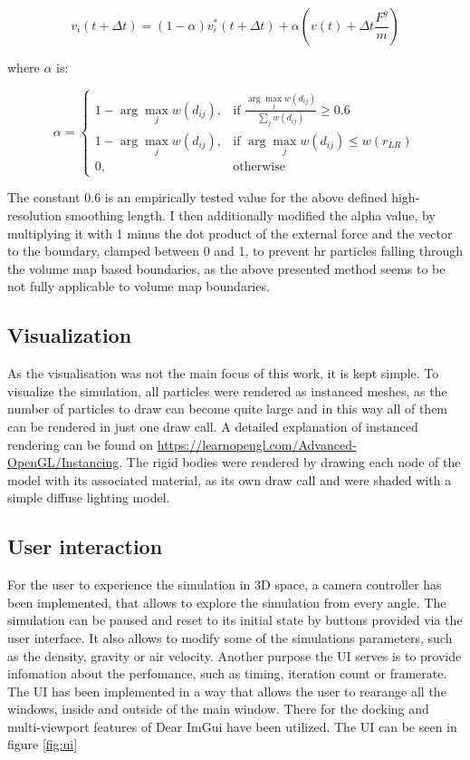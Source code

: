 \documentclass[intern]{cgMA}
\begin{document}
    \begin{equation}
        v_i(t + \Delta t)  = (1 - \alpha)v_i^*(t + \Delta t) + \alpha(v(t) + \Delta t \frac{F^g}{m})
    \end{equation}

    where $\alpha$ is:

    \begin{equation}
        \alpha = 
        \begin{cases}
            1 - \arg \max_j w(d_{ij}),& \text{if } \frac{\arg \max_j w(d_{ij})}{\sum_j w(d_{ij})} \geq 0.6 \\
            1 - \arg \max_j w(d_{ij}),& \text{if } \arg \max_j w(d_{ij}) \leq w(r_{LR}) \\
            0,              & \text{otherwise}
        \end{cases}
    \end{equation}

    The constant $0.6$ is an empirically tested value for the above defined high-resolution smoothing length. \cite{10.2312:PE:vriphys:vriphys12:053-060} I then additionally modified the alpha value, by multiplying it with 1 minus the dot product of the external force and the vector to the boundary, clamped between 0 and 1, to prevent hr particles falling through the volume map based boundaries, as the above presented method seems to be not fully applicable to volume map boundaries.
    
    \subsection{Visualization}
    As the visualisation was not the main focus of this work, it is kept simple. To visualize the simulation, all particles were rendered as instanced meshes, as the number of particles to draw can become quite large and in this way all of them can be rendered in just one draw call. A detailed explanation of instanced rendering can be found on \url{https://learnopengl.com/Advanced-OpenGL/Instancing}. The rigid bodies were rendered by drawing each node of the model with its associated material, as its own draw call and were shaded with a simple diffuse lighting model.

    \subsection{User interaction}
    For the user to experience the simulation in 3D space, a camera controller has been implemented, that allows to explore the simulation from every angle. The simulation can be paused and reset to its initial state by buttons provided via the user interface. It also allows to modify some of the simulations parameters, such as the density, gravity or air velocity. Another purpose the UI serves is to provide infomation about the perfomance, such as timing, iteration count or framerate. The UI has been implemented in a way that allows the user to rearange all the windows, inside and outside of the main window. There for the docking and multi-viewport features of Dear ImGui have been utilized. The UI can be seen in figure \ref{fig:ui}
\end{document}
